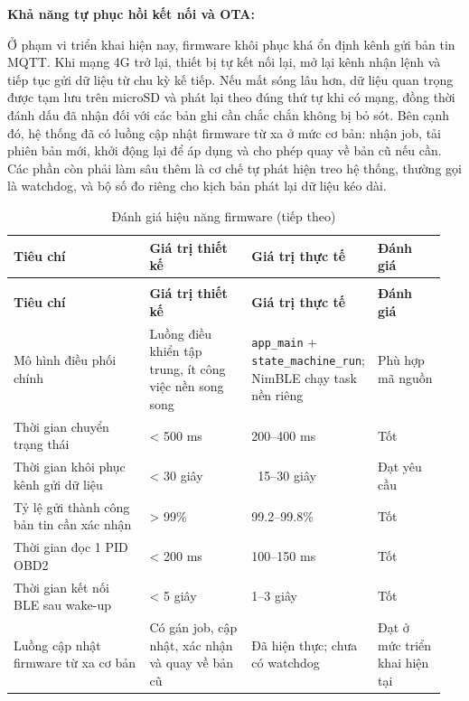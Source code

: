 \documentclass[a4paper]{extarticle}
\newcommand{\thesissettableid}[2]{%
  \renewcommand{\thetable}{#1}%
  \renewcommand{\theHtable}{#2}%
}
\begin{document}
\textbf{Khả năng tự phục hồi kết nối và OTA:}

Ở phạm vi triển khai hiện nay, firmware khôi phục khá ổn định kênh gửi
bản tin MQTT. Khi mạng 4G trở lại, thiết bị tự kết nối lại, mở lại kênh
nhận lệnh và tiếp tục gửi dữ liệu từ chu kỳ kế tiếp. Nếu mất sóng lâu
hơn, dữ liệu quan trọng được tạm lưu trên microSD và phát lại theo đúng
thứ tự khi có mạng, đồng thời đánh dấu đã nhận đối với các bản ghi cần
chắc chắn không bị bỏ sót. Bên cạnh đó, hệ thống đã có luồng cập nhật
firmware từ xa ở mức cơ bản: nhận job, tải phiên bản mới, khởi động lại
để áp dụng và cho phép quay về bản cũ nếu cần. Các phần còn phải làm sâu
thêm là cơ chế tự phát hiện treo hệ thống, thường gọi là watchdog, và bộ
số đo riêng cho kịch bản phát lại dữ liệu kéo dài.


{\thesissettableid{5.2}{tab-ch5-anh-gia-hieu-nang-firmware}
\def\LTcaptype{table}
\begin{longtable}{|L{0.327\linewidth}|L{0.243\linewidth}|L{0.224\linewidth}|L{0.160\linewidth}|}
\caption{Đánh giá hiệu năng firmware}\label{tab:ch5-anh-gia-hieu-nang-firmware}\\
\hline \textbf{Tiêu chí} & \textbf{Giá trị thiết kế} & \textbf{Giá trị thực tế} & \textbf{Đánh giá} \\
\hline
\endfirsthead
\caption[]{Đánh giá hiệu năng firmware (tiếp theo)}\\
\hline \textbf{Tiêu chí} & \textbf{Giá trị thiết kế} & \textbf{Giá trị thực tế} & \textbf{Đánh giá} \\
\hline
\endhead
\hline
\endfoot
\endlastfoot
Mô hình điều phối chính & Luồng điều khiển tập trung, ít công việc nền
song song & \texttt{app\_main} + \nolinkurl{state_machine_run}; NimBLE chạy
task nền riêng & Phù hợp mã nguồn \\\hline
Thời gian chuyển trạng thái & \textless{} 500 ms & 200--400 ms & Tốt \\\hline
Thời gian khôi phục kênh gửi dữ liệu & \textless{} 30 giây & ~15--30
giây & Đạt yêu cầu \\\hline
Tỷ lệ gửi thành công bản tin cần xác nhận & \textgreater{} 99\% & 99.2--99.8\% &
Tốt \\\hline
Thời gian đọc 1 PID OBD2 & \textless{} 200 ms & 100--150 ms & Tốt \\\hline
Thời gian kết nối BLE sau wake-up & \textless{} 5 giây & 1--3 giây &
Tốt \\\hline
Luồng cập nhật firmware từ xa cơ bản & Có gán job, cập nhật, xác nhận và quay về bản cũ & Đã hiện
thực; chưa có watchdog & Đạt ở mức triển khai hiện tại \\\hline
\end{longtable}
}
\end{document}
